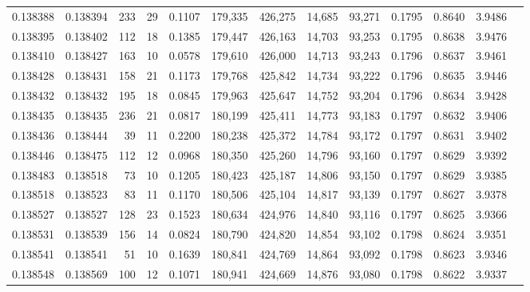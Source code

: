 \begin{tabular}{rrrrrrrrrrrrr}
0.138388 & 0.138394 &   233 &  29 &                                     0.1107 & 179,335 & 426,275 &  14,685 &  93,271 & 0.1795 & 0.8640 & 3.9486 \\
0.138395 & 0.138402 &   112 &  18 &                                     0.1385 & 179,447 & 426,163 &  14,703 &  93,253 & 0.1795 & 0.8638 & 3.9476 \\
0.138410 & 0.138427 &   163 &  10 &                                     0.0578 & 179,610 & 426,000 &  14,713 &  93,243 & 0.1796 & 0.8637 & 3.9461 \\
0.138428 & 0.138431 &   158 &  21 &                                     0.1173 & 179,768 & 425,842 &  14,734 &  93,222 & 0.1796 & 0.8635 & 3.9446 \\
0.138432 & 0.138432 &   195 &  18 &                                     0.0845 & 179,963 & 425,647 &  14,752 &  93,204 & 0.1796 & 0.8634 & 3.9428 \\
0.138435 & 0.138435 &   236 &  21 &                                     0.0817 & 180,199 & 425,411 &  14,773 &  93,183 & 0.1797 & 0.8632 & 3.9406 \\
0.138436 & 0.138444 &    39 &  11 &                                     0.2200 & 180,238 & 425,372 &  14,784 &  93,172 & 0.1797 & 0.8631 & 3.9402 \\
0.138446 & 0.138475 &   112 &  12 &                                     0.0968 & 180,350 & 425,260 &  14,796 &  93,160 & 0.1797 & 0.8629 & 3.9392 \\
0.138483 & 0.138518 &    73 &  10 &                                     0.1205 & 180,423 & 425,187 &  14,806 &  93,150 & 0.1797 & 0.8629 & 3.9385 \\
0.138518 & 0.138523 &    83 &  11 &                                     0.1170 & 180,506 & 425,104 &  14,817 &  93,139 & 0.1797 & 0.8627 & 3.9378 \\
0.138527 & 0.138527 &   128 &  23 &                                     0.1523 & 180,634 & 424,976 &  14,840 &  93,116 & 0.1797 & 0.8625 & 3.9366 \\
0.138531 & 0.138539 &   156 &  14 &                                     0.0824 & 180,790 & 424,820 &  14,854 &  93,102 & 0.1798 & 0.8624 & 3.9351 \\
0.138541 & 0.138541 &    51 &  10 &                                     0.1639 & 180,841 & 424,769 &  14,864 &  93,092 & 0.1798 & 0.8623 & 3.9346 \\
0.138548 & 0.138569 &   100 &  12 &                                     0.1071 & 180,941 & 424,669 &  14,876 &  93,080 & 0.1798 & 0.8622 & 3.9337 \\

\end{tabular}
